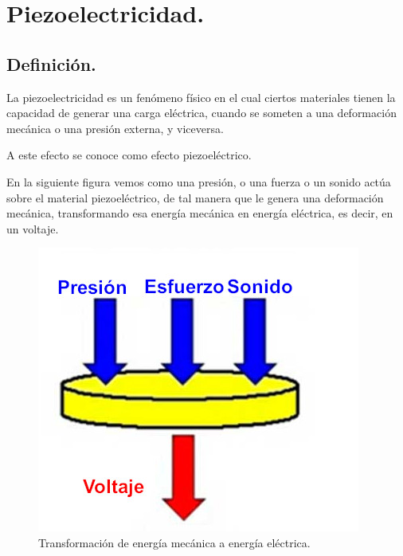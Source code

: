 \documentclass[12pt]{article}
\begin{document}
\section{Piezoelectricidad.}
\subsection{Definición.}

La piezoelectricidad es un fenómeno físico en el cual ciertos materiales tienen la capacidad de generar una carga eléctrica, cuando se someten a una deformación mecánica o una presión externa, y viceversa.

A este efecto se conoce como efecto piezoeléctrico.

\vspace{0.3cm}
En la siguiente figura vemos como una presión, o una fuerza o un sonido actúa sobre el material piezoeléctrico, de tal manera que le genera una deformación mecánica, transformando esa energía mecánica en energía eléctrica, es decir, en un voltaje.
\begin{figure}[H]
    \centering
    \includegraphics[scale=0.5]{Imagenes/Piezoelectricidad_04b.jpg}
    \caption{Transformación de energía mecánica a energía eléctrica.}
\end{figure}
\end{document}
